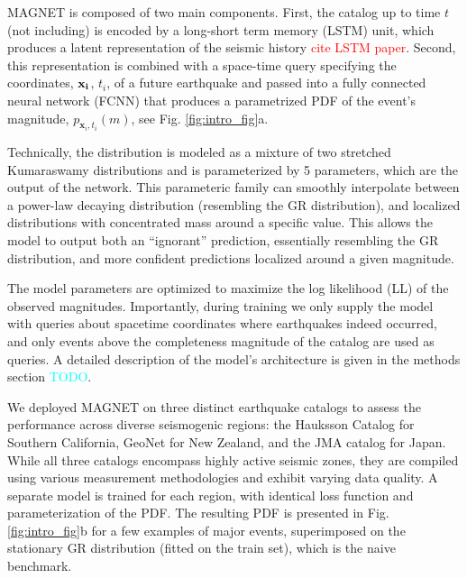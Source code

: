 \documentclass[pdflatex]{sn-jnl}
\newcommand{\yohai}[1]{{\textcolor{red}{#1}}}
\newcommand{\neri}[1]{{\textcolor{cyan}{#1}}}
\begin{document}
MAGNET is composed of two main components. First, the catalog up to time $t$ (not including) is encoded by a long-short term memory (LSTM) unit, which produces a latent representation of the seismic history \yohai{cite LSTM paper}.
Second, this representation is combined with a space-time query specifying the coordinates, $\bf{x}_i$, $t_i$, of a future earthquake and passed into a fully connected neural network (FCNN) that produces a parametrized PDF of the event's magnitude, $p_{\textbf{x}_i, t_i}(m)$, see Fig. \ref{fig:intro_fig}a. 

Technically, the distribution is modeled as a mixture of two stretched Kumaraswamy distributions \cite{kumaraswamy_generalized_1980} and is parameterized by 5 parameters, which are the output of the network. This parameteric family can  smoothly interpolate between a power-law decaying distribution (resembling the GR distribution), and localized distributions with concentrated mass around a specific value. This allows the model to output both an ``ignorant'' prediction, essentially resembling the GR distribution, and more confident predictions localized around a given magnitude.

The model parameters are optimized to maximize the log likelihood (LL) of the observed magnitudes. Importantly, during training we only supply the model with queries about spacetime coordinates where earthquakes indeed occurred, and only events above the completeness magnitude of the catalog are used as queries. A detailed description of the model's architecture is given in the methods section \neri{TODO}.


We deployed MAGNET on three distinct earthquake catalogs to assess the performance across diverse seismogenic regions: the Hauksson Catalog \cite{hauksson_waveform_2012} for Southern California, GeoNet \cite{gns_geonet_1970} for New Zealand, and the JMA catalog \cite{noauthor_japan_nodate-1} for Japan. While all three catalogs encompass highly active seismic zones, they are compiled using various measurement methodologies and exhibit varying data quality. A separate model is trained for each region, with identical loss function and parameterization of the PDF. The resulting PDF is presented in Fig. \ref{fig:intro_fig}b for a few examples of major events, superimposed on the stationary GR distribution (fitted on the train set), which is the naive benchmark.
\end{document}
